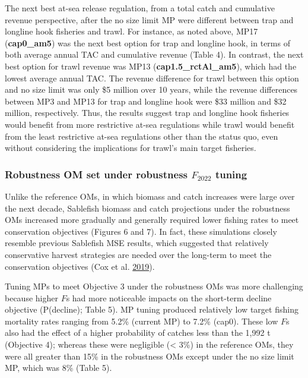 \documentclass[11pt]{book}
\begin{document}
The next best at-sea release regulation, from a total catch and cumulative revenue perspective, after the no size limit MP were different between trap and longline hook fisheries and trawl. For instance, as noted above, MP17 (\textbf{cap0\_am5}) was the next best option for trap and longline hook, in terms of both average annual TAC and cumulative revenue (Table 4). In contrast, the next best option for trawl revenue was MP13 (\textbf{cap1.5\_rctAl\_am5}), which had the lowest average annual TAC. The revenue difference for trawl between this option and no size limit was only \$5 million over 10 years, while the revenue differences between MP3 and MP13 for trap and longline hook were \$33 million and \$32 million, respectively. Thus, the results suggest trap and longline hook fisheries would benefit from more restrictive at-sea regulations while trawl would benefit from the least restrictive at-sea regulations other than the status quo, even without considering the implications for trawl's main target fisheries.

\hypertarget{robustness-om-set-under-robustness-f_2022-tuning}{%
\subsubsection{\texorpdfstring{Robustness OM set under robustness \(F_{2022}\) tuning}{Robustness OM set under robustness F\_\{2022\} tuning}}\label{robustness-om-set-under-robustness-f_2022-tuning}}

Unlike the reference OMs, in which biomass and catch increases were large over the next decade, Sablefish biomass and catch projections under the robustness OMs increased more gradually and generally required lower fishing rates to meet conservation objectives (Figures 6 and 7). In fact, these simulations closely resemble previous Sablefish MSE results, which suggested that relatively conservative harvest strategies are needed over the long-term to meet the conservation objectives (Cox et al. \protect\hyperlink{ref-cox2019evaluating}{2019}).

Tuning MPs to meet Objective 3 under the robustness OMs was more challenging because higher \(F\)s had more noticeable impacts on the short-term decline objective (P(decline); Table 5). MP tuning produced relatively low target fishing mortality rates ranging from 5.2\% (current MP) to 7.2\% (cap0). These low \(F\)s also had the effect of a higher probability of catches less than the 1,992 t (Objective 4); whereas these were negligible (\textless{} 3\%) in the reference OMs, they were all greater than 15\% in the robustness OMs except under the no size limit MP, which was 8\% (Table 5).
\end{document}
